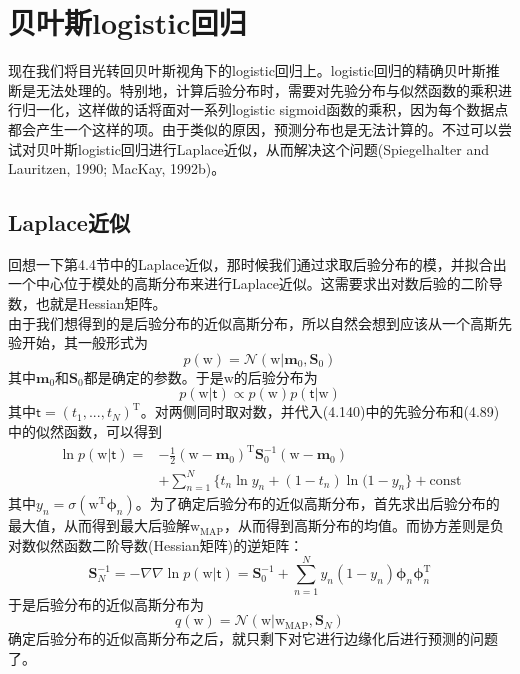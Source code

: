 \documentclass[b5paper]{book}
\numberwithin{equation}{chapter}
\newcommand {\bw} {\boldsymbol{\mathrm{w}}}
\newcommand {\sft} {\boldsymbol{\mathsf{t}}}
\newcommand {\rmT} {\mathrm{T}}
\newcommand {\bfphi} {\boldsymbol{\phi}}
\newcommand {\calN} {\mathcal{N}}
\newcommand {\insertline} {\noindent{\color{red} \rule[5pt]{\textwidth}{0.1em}}}
\begin{document}
	\section{贝叶斯logistic回归}
	\insertline
	\textnormal{
	\indent 现在我们将目光转回贝叶斯视角下的logistic回归上。logistic回归的精确贝叶斯推断是无法处理的。特别地，计算后验分布时，需要对先验分布与似然函数的乘积进行归一化，这样做的话将面对一系列logistic sigmoid函数的乘积，因为每个数据点都会产生一个这样的项。由于类似的原因，预测分布也是无法计算的。不过可以尝试对贝叶斯logistic回归进行Laplace近似，从而解决这个问题(Spiegelhalter and Lauritzen, 1990; MacKay, 1992b)。
	}
	\subsection{Laplace近似}
	\textnormal{回想一下第4.4节中的Laplace近似，那时候我们通过求取后验分布的模，并拟合出一个中心位于模处的高斯分布来进行Laplace近似。这需要求出对数后验的二阶导数，也就是Hessian矩阵。\\
	\indent 由于我们想得到的是后验分布的近似高斯分布，所以自然会想到应该从一个高斯先验开始，其一般形式为
	\begin{equation}
		p(\bw) = \calN(\bw|\mathbf{m}_0, \mathbf{S}_0)
	\end{equation}
	其中$\mathbf{m}_0$和$\mathbf{S}_0$都是确定的参数。于是$\bw$的后验分布为
	\begin{equation}
		p(\bw|\sft) \propto p(\bw) p(\sft|\bw)
	\end{equation}
	其中$\sft = (t_1, ..., t_N)^{\rmT}$。对两侧同时取对数，并代入(4.140)中的先验分布和(4.89)中的似然函数，可以得到
	\begin{equation}
	\begin{split}
		\ln p(\bw|\sft) = &-\frac{1}{2}(\bw - \mathbf{m}_0)^{\rmT} \mathbf{S}_0^{-1} (\bw - \mathbf{m}_0) \\
		&+\sum_{n=1}^N \{t_n \ln y_n + (1 - t_n)\ln (1-y_n\} + \mathrm{const}
	\end{split}
	\end{equation}
	其中$y_n = \sigma(\bw^{\rmT}\bfphi_n)$。为了确定后验分布的近似高斯分布，首先求出后验分布的最大值，从而得到最大后验解$\bw_{\mathrm{MAP}}$，从而得到高斯分布的均值。而协方差则是负对数似然函数二阶导数(Hessian矩阵)的逆矩阵：
	\begin{equation}
		\mathbf{S}_N^{-1} = -\nabla \nabla \ln p(\bw|\sft) = \mathbf{S}_0^{-1} + \sum_{n=1}^N y_n(1-y_n)\bfphi_n \bfphi_n^{\rmT}
	\end{equation}
	于是后验分布的近似高斯分布为
	\begin{equation}
		q(\bw) = \calN(\bw|\bw_{\mathrm{MAP}},\mathbf{S}_N)
	\end{equation}
	\indent 确定后验分布的近似高斯分布之后，就只剩下对它进行边缘化后进行预测的问题了。
	}
\end{document}
